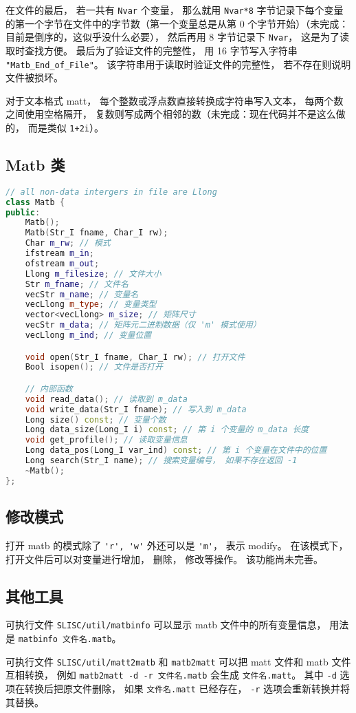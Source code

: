 在文件的最后， 若一共有 \verb|Nvar| 个变量， 那么就用 \verb|Nvar*8| 字节记录下每个变量的第一个字节在文件中的字节数（第一个变量总是从第 0 个字节开始）（未完成：目前是倒序的，这似乎没什么必要）， 然后再用 8 字节记录下 \verb|Nvar|， 这是为了读取时查找方便。 最后为了验证文件的完整性， 用 16 字节写入字符串 \verb|"Matb_End_of_File"|。 该字符串用于读取时验证文件的完整性， 若不存在则说明文件被损坏。

对于文本格式 matt， 每个整数或浮点数直接转换成字符串写入文本， 每两个数之间使用空格隔开， 复数则写成两个相邻的数（未完成：现在代码并不是这么做的， 而是类似 \verb|1+2i|）。

\subsection{Matb 类}
\begin{lstlisting}[language=cpp]
// all non-data intergers in file are Llong
class Matb {
public:
    Matb();
    Matb(Str_I fname, Char_I rw);
    Char m_rw; // 模式
    ifstream m_in;
    ofstream m_out;
    Llong m_filesize; // 文件大小
    Str m_fname; // 文件名
    vecStr m_name; // 变量名
    vecLlong m_type; // 变量类型
    vector<vecLlong> m_size; // 矩阵尺寸
    vecStr m_data; // 矩阵元二进制数据（仅 'm' 模式使用）
    vecLlong m_ind; // 变量位置

    void open(Str_I fname, Char_I rw); // 打开文件
    Bool isopen(); // 文件是否打开

    // 内部函数
    void read_data(); // 读取到 m_data
    void write_data(Str_I fname); // 写入到 m_data
    Long size() const; // 变量个数
    Long data_size(Long_I i) const; // 第 i 个变量的 m_data 长度
    void get_profile(); // 读取变量信息
    Long data_pos(Long_I var_ind) const; // 第 i 个变量在文件中的位置
    Long search(Str_I name); // 搜索变量编号， 如果不存在返回 -1
    ~Matb();
};
\end{lstlisting}

\subsection{修改模式}
打开 matb 的模式除了 \verb|'r', 'w'| 外还可以是 \verb|'m'|， 表示 modify。 在该模式下， 打开文件后可以对变量进行增加， 删除， 修改等操作。 该功能尚未完善。

\subsection{其他工具}
可执行文件 \verb|SLISC/util/matbinfo| 可以显示 matb 文件中的所有变量信息， 用法是 \verb|matbinfo 文件名.matb|。

可执行文件 \verb|SLISC/util/matt2matb| 和 \verb|matb2matt| 可以把 matt 文件和 matb 文件互相转换， 例如 \verb|matb2matt -d -r 文件名.matb| 会生成 \verb|文件名.matt|。 其中 \verb|-d| 选项在转换后把原文件删除， 如果 \verb|文件名.matt| 已经存在， \verb|-r| 选项会重新转换并将其替换。
